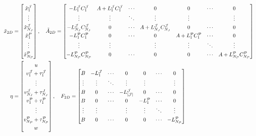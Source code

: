 \begin{equation}\label{eqn:2D-CMO}
\renewcommand{\arraystretch}{1.3}
    \begin{split}    
        \Tilde{x}_{2D} &= 
        \begin{bmatrix}
            \hat{x}_1^{\mcJ} \\ \vdots \\ \hat{x}_{N_J}^{\mcJ} \\ \hat{x}_1^{P} \\ \vdots \\ \hat{x}_{N_P}^{\mcP}
        \end{bmatrix}, \quad
        \Tilde{A}_{2D} = 
        \begin{bmatrix}
            -L_1^{\mcJ}C_1^{\mcJ} & A + L_1^{\mcJ}C_1^{\mcJ} & \cdots & 0  & 0 & \cdots & 0 \\
            \vdots & \vdots & \ddots & \vdots & \vdots & & \vdots \\
            -L_{N_J}^{\mcJ}C_{N_J}^{\mcJ} & 0 & \cdots & A + L_{N_J}^{\mcJ}C_{N_J}^{\mcJ} & 0 & \cdots & 0 \\
            -L_{1}^{\mcP}C_{1}^{\mcP} & 0 & \cdots & 0 & A + L_1^{\mcP}C_1^{\mcP} & \cdots & 0 \\
            \vdots & \vdots &  & \vdots & \vdots & \ddots & \vdots \\
            -L_{N_P}^{\mcP}C_{N_P}^{\mcP} & 0 & \cdots & 0 & 0 & \cdots & A + L_{N_P}^{\mcP}C_{N_P}^{\mcP} \\
        \end{bmatrix} \\
        \eta &= 
        \begin{bmatrix}
            u \\ v_1^{\mcJ} + \tau_1^{\mcJ} \\ \vdots \\ v_{N_J}^{\mcJ} + \tau_{N_J}^J \\ v_1^{\mcP} + \tau_1^{\mcP} \\ \vdots \\ v_{N_P}^{\mcP} + \tau_{N_P}^{\mcP} \\ w \\
        \end{bmatrix}, \quad 
        F_{2D} = 
        \begin{bmatrix}
            B & -L_1^{\mcJ} & \cdots & 0 & 0 & \cdots & 0 \\
            \vdots & \vdots & \ddots & \vdots & \vdots & & \vdots \\
            B & 0 & \cdots & -L_{\cJ}^{\mcJ} & 0 & \cdots & 0 \\
            B & 0 & \cdots & 0 & -L_{1}^{\mcP} & \cdots & 0 \\
            \vdots & \vdots & & \vdots & \vdots & \ddots & \vdots \\
            B & 0 & \cdots & 0 & 0 & \cdots & -L_{N_P}^{\mcP} \\
        \end{bmatrix}\\
    \end{split}
\end{equation}
